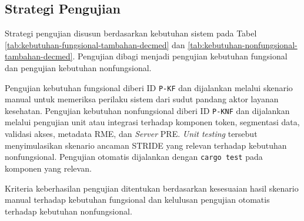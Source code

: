\subsection{Strategi Pengujian}
\label{subsec:strategi-pengujian}

Strategi pengujian disusun berdasarkan kebutuhan sistem pada Tabel \ref{tab:kebutuhan-fungsional-tambahan-decmed} dan \ref{tab:kebutuhan-nonfungsional-tambahan-decmed}. Pengujian dibagi menjadi pengujian kebutuhan fungsional dan pengujian kebutuhan nonfungsional.

Pengujian kebutuhan fungsional diberi ID \texttt{P-KF} dan dijalankan melalui skenario manual untuk memeriksa perilaku sistem dari sudut pandang aktor layanan kesehatan. Pengujian kebutuhan nonfungsional diberi ID \texttt{P-KNF} dan dijalankan melalui pengujian unit atau integrasi terhadap komponen token, segmentasi data, validasi akses, metadata RME, dan \textit{Server} PRE. \textit{Unit testing} tersebut menyimulasikan skenario ancaman STRIDE yang relevan terhadap kebutuhan nonfungsional. Pengujian otomatis dijalankan dengan \texttt{cargo test} pada komponen yang relevan.

Kriteria keberhasilan pengujian ditentukan berdasarkan kesesuaian hasil skenario manual terhadap kebutuhan fungsional dan kelulusan pengujian otomatis terhadap kebutuhan nonfungsional.
